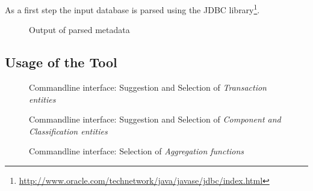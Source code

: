 As a first step the input database is parsed using the JDBC library\footnote{\url{http://www.oracle.com/technetwork/java/javase/jdbc/index.html}}.

\begin{figure}[p]
  
  \caption{Output of parsed metadata}
  \label{fig:metadataOutput}
\end{figure}

\subsection{Usage of the Tool}

\begin{figure}[p]
  
  \caption{Commandline interface: Suggestion and Selection of \emph{Transaction entities}}
  \label{fig:transactoinSuggestion}
\end{figure}

\begin{figure}[p]
  
  \caption{Commandline interface: Suggestion and Selection of \emph{Component and Classification entities}}
  \label{fig:dimensionalModelSuggestion}
\end{figure}

\begin{figure}[p]
  
  \caption{Commandline interface: Selection of \emph{Aggregation functions}}
  \label{fig:aggregationSelection}
\end{figure}

